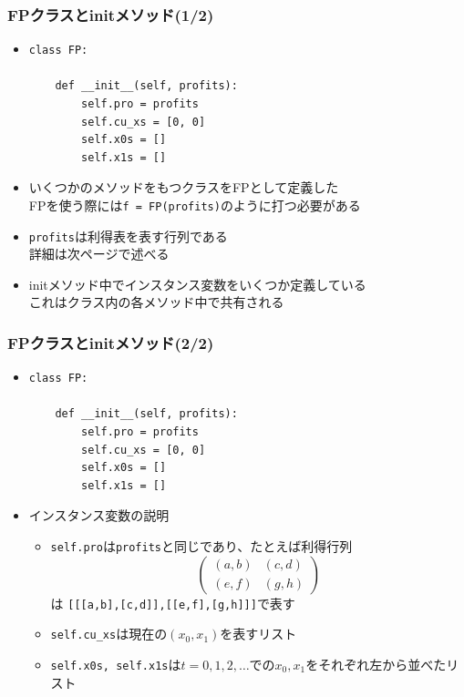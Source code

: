 \documentclass[dvipdfmx,fleqn,handout]{beamer}
\begin{document}
\begin{frame}[fragile]%
\frametitle{FPクラスとinitメソッド(1/2)}
\begin{itemize}\setlength{\parskip}{0.5em}
\item

\footnotesize
\begin{verbatim}
class FP:

    def __init__(self, profits):
        self.pro = profits
        self.cu_xs = [0, 0]
        self.x0s = []
        self.x1s = []
 \end{verbatim}\pause
\normalsize

\item
いくつかのメソッドをもつクラスをFPとして定義した\pause\\
FPを使う際には\verb|f = FP(profits)|のように打つ必要がある\pause
\item
\verb|profits|は利得表を表す行列である\\
詳細は次ページで述べる\pause
\item
initメソッド中でインスタンス変数をいくつか定義している\pause\\
これはクラス内の各メソッド中で共有される



\end{itemize}
\end{frame}


\begin{frame}[fragile]%
\frametitle{FPクラスとinitメソッド(2/2)}
\begin{itemize}\setlength{\parskip}{0.5em}
\item

\footnotesize
\begin{verbatim}
class FP:

    def __init__(self, profits):
        self.pro = profits
        self.cu_xs = [0, 0]
        self.x0s = []
        self.x1s = []
 \end{verbatim}\pause
\normalsize
\item
インスタンス変数の説明\pause
\begin{itemize}\setlength{\parskip}{0.5em}

\item
\verb|self.pro|は\verb|profits|と同じであり、たとえば利得行列
\footnotesize
\begin{equation*}
\begin{pmatrix}
(a,b) & (c,d)\\
(e,f) & (g,h)
\end{pmatrix}
\end{equation*}
\normalsize
は
\verb|[[[a,b],[c,d]],[[e,f],[g,h]]]|で表す
\pause
\item
\verb|self.cu_xs|は現在の$(x_0,x_1)$を表すリスト\pause
\item
\verb|self.x0s, self.x1s|は$t=0,1,2,\dots$での$x_0,x_1$をそれぞれ左から並べたリスト

\end{itemize}

\end{itemize}
\end{frame}
\end{document}
